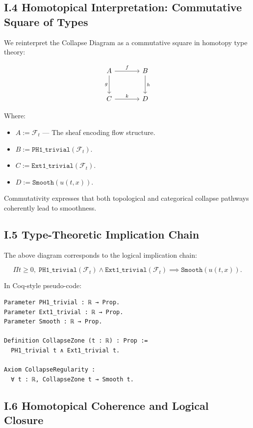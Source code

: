 \documentclass[11pt]{article}
\begin{document}
\subsection*{I.4 Homotopical Interpretation: Commutative Square of Types}

We reinterpret the Collapse Diagram as a commutative square in homotopy type theory:

\[
\begin{tikzcd}[row sep=large, column sep=large]
A
  \arrow[r, "f"]
  \arrow[d, "g"']
& B
  \arrow[d, "h"] \\
C
  \arrow[r, "k"]
& D
\end{tikzcd}
\]

Where:

\begin{itemize}
  \item \( A := \mathcal{F}_t \) — The sheaf encoding flow structure.
  \item \( B := \texttt{PH1\_trivial}(\mathcal{F}_t) \).
  \item \( C := \texttt{Ext1\_trivial}(\mathcal{F}_t) \).
  \item \( D := \texttt{Smooth}(u(t, x)) \).
\end{itemize}

Commutativity expresses that both topological and categorical collapse pathways coherently lead to smoothness.

\subsection*{I.5 Type-Theoretic Implication Chain}

The above diagram corresponds to the logical implication chain:

\[
\Pi t \geq 0,\;
\texttt{PH1\_trivial}(\mathcal{F}_t) \land \texttt{Ext1\_trivial}(\mathcal{F}_t) \implies \texttt{Smooth}(u(t, x)).
\]

In Coq-style pseudo-code:

\begin{lstlisting}[language=Coq]
Parameter PH1_trivial : ℝ → Prop.
Parameter Ext1_trivial : ℝ → Prop.
Parameter Smooth : ℝ → Prop.

Definition CollapseZone (t : ℝ) : Prop :=
  PH1_trivial t ∧ Ext1_trivial t.

Axiom CollapseRegularity :
  ∀ t : ℝ, CollapseZone t → Smooth t.
\end{lstlisting}

\subsection*{I.6 Homotopical Coherence and Logical Closure}
\end{document}

